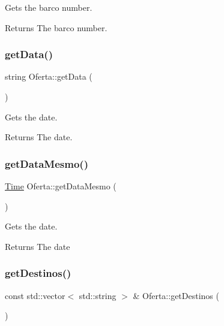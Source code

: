 Gets the barco number. 

\begin{DoxyReturn}{Returns}
The barco number. 
\end{DoxyReturn}
\mbox{\label{classOferta_a2b156b75371ad59af54ad96ad79c9d1e}} 
\subsubsection{\texorpdfstring{get\+Data()}{getData()}}
{\footnotesize\ttfamily string Oferta\+::get\+Data (\begin{DoxyParamCaption}{ }\end{DoxyParamCaption})}



Gets the date. 

\begin{DoxyReturn}{Returns}
The date. 
\end{DoxyReturn}
\mbox{\label{classOferta_a13ebfcae88d39a90f0c66368534ed335}} 
\subsubsection{\texorpdfstring{get\+Data\+Mesmo()}{getDataMesmo()}}
{\footnotesize\ttfamily \hyperlink{classTime}{Time} Oferta\+::get\+Data\+Mesmo (\begin{DoxyParamCaption}{ }\end{DoxyParamCaption})\hspace{0.3cm}{\ttfamily [inline]}}



Gets the date. 

\begin{DoxyReturn}{Returns}
The date 
\end{DoxyReturn}
\mbox{\label{classOferta_a746c91e5db19098d211a3f6bde2ec8ec}} 
\subsubsection{\texorpdfstring{get\+Destinos()}{getDestinos()}}
{\footnotesize\ttfamily const std\+::vector$<$ std\+::string $>$ \& Oferta\+::get\+Destinos (\begin{DoxyParamCaption}{ }\end{DoxyParamCaption})}



